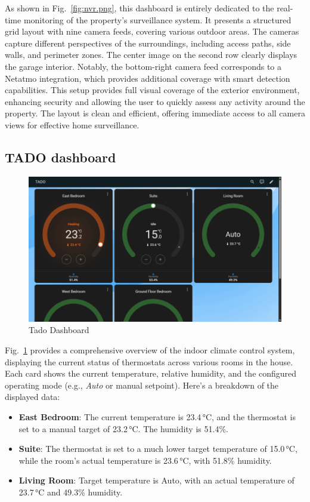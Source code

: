 \documentclass[graybox]{svmult}
\begin{document}
As shown in Fig.~\ref{fig:nvr.png}, this dashboard is entirely dedicated to the real-time monitoring of the property's surveillance system. It presents a structured grid layout with nine camera feeds, covering various outdoor areas. The cameras capture different perspectives of the surroundings, including access paths, side walls, and perimeter zones. The center image on the second row clearly displays the garage interior. Notably, the bottom-right camera feed corresponds to a Netatmo integration, which provides additional coverage with smart detection capabilities. This setup provides full visual coverage of the exterior environment, enhancing security and allowing the user to quickly assess any activity around the property. The layout is clean and efficient, offering immediate access to all camera views for effective home surveillance.

\subsection{TADO dashboard}

\begin{figure}[H] 
	\centering
	\includegraphics[width=\textwidth]{Tado.png}
	\caption{Tado Dashboard}
	\label{fig:Tado.png}
\end{figure}

Fig.~\ref{fig:Tado.png} provides a comprehensive overview of the indoor climate control system, displaying the current status of thermostats across various rooms in the house. Each card shows the current temperature, relative humidity, and the configured operating mode (e.g., \textit{Auto} or manual setpoint).
Here's a breakdown of the displayed data:

\begin{itemize}
    \item \textbf{East Bedroom}: The current temperature is 23.4\,°C, and the thermostat is set to a manual target of 23.2\,°C. The humidity is 51.4\%.
    
    \item \textbf{Suite}: The thermostat is set to a much lower target temperature of 15.0\,°C, while the room’s actual temperature is 23.6\,°C, with 51.8\% humidity.
    
    \item \textbf{Living Room}: Target temperature is Auto, with an actual temperature of 23.7\,°C and 49.3\% humidity.
\end{itemize}
\end{document}
